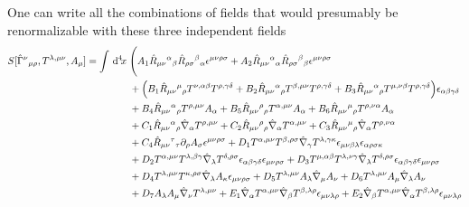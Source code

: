 \documentclass[%
  showpacs,showkeys,prd,superscriptaddress]{revtex4-1}
\begin{document}
One can  write all the combinations of fields that would presumably be renormalizable with these three independent fields
\begin{equation}
  \begin{split}
    \label{3+1full}
     S[\hat{\Gamma}^{\nu}{}_{\mu\rho},T^{\lambda,\mu\nu},A_{\mu}] =\int \dn{4}{x} & \Bigg( A_1 \hat{ R}_{\mu\nu}{}^{\alpha}{}_\beta \hat{ R}_{\rho\sigma}{}^{\beta}{}_\alpha\epsilon^{\mu\nu\rho\sigma}+A_2 \hat{ R}_{\mu\nu}{}^{\alpha}{}_\alpha \hat{ R}_{\rho\sigma}{}^{\beta}{}_\beta\epsilon^{\mu\nu\rho\sigma}
    \\
    & + \Big(B_1 \hat{ R}_{\mu\nu}{}^{\mu}{}_\rho T^{\nu,\alpha\beta}T^{\rho,\gamma\delta}+B_2 \hat{ R}_{\mu\nu}{}^{\alpha}{}_\rho T^{\beta,\mu\nu}T^{\rho,\gamma\delta}+B_3\hat{ R}_{\mu\nu}{}^{\alpha}{}_\rho T^{\mu,\nu\beta}T^{\rho,\gamma\delta}\Big)\epsilon_{\alpha\beta\gamma\delta}
    \\
    & + B_4\hat{ R}_{\mu\nu}{}^{\alpha}{}_\rho T^{\rho,\mu\nu}A_\alpha+B_5\hat{ R}_{\mu\nu}{}^{\rho}{}_\rho T^{\alpha,\mu\nu}A_\alpha+B_6 \hat{ R}_{\mu\nu}{}^{\mu}{}_\rho T^{\rho,\nu\alpha}A_\alpha 
    \\
    & + C_1\hat{ R}_{\mu\nu}{}^{\alpha}{}_\rho \hat{\nabla}_\alpha T^{\rho,\mu\nu}+C_2\hat{ R}_{\mu\nu}{}^{\rho}{}_\rho \hat{\nabla}_\alpha T^{\alpha,\mu\nu} +C_3 \hat{ R}_{\mu\nu}{}^{\mu}{}_\rho \hat{\nabla}_\alpha T^{\rho,\nu\alpha}
    \\
    & +C_4\hat{ R}_{\mu\nu}{}^{\tau}{}_\tau \partial_\rho A_\sigma \epsilon^{\mu\nu\rho\sigma}+D_1T^{\alpha,\mu\nu}T^{\beta,\rho\sigma}\hat{\nabla}_\gamma T^{\lambda,\gamma\kappa}\epsilon_{\mu\nu\beta\lambda}\epsilon_{\alpha\rho\sigma\kappa}
    \\  
    & + D_2T^{\alpha,\mu\nu}T^{\lambda,\beta\gamma}\hat{\nabla}_\lambda T^{\delta,\rho\sigma}\epsilon_{\alpha\beta\gamma\delta}\epsilon_{\mu\nu\rho\sigma}+D_3T^{\mu,\alpha\beta}T^{\lambda,\nu\gamma}\hat{\nabla}_\lambda T^{\delta,\rho\sigma}\epsilon_{\alpha\beta\gamma\delta}\epsilon_{\mu\nu\rho\sigma}
    \\
    & + D_4T^{\lambda,\mu\nu}T^{\kappa,\rho\sigma}\hat{\nabla}_\lambda A_\kappa \epsilon_{\mu\nu\rho\sigma}+D_5T^{\lambda,\mu\nu}A_\lambda\hat{\nabla}_\mu A_\nu +D_6T^{\lambda,\mu\nu}A_\mu\hat{\nabla}_\lambda A_\nu
    \\
    & + D_7A_\lambda  A_\mu\hat{\nabla}_\nu T^{\lambda,\mu\nu} +E_1\hat{\nabla}_\alpha T^{\alpha,\mu\nu}\hat{\nabla}_\beta T^{\beta,\lambda\rho}\epsilon_{\mu\nu\lambda\rho}+E_2\hat{\nabla}_\beta T^{\alpha,\mu\nu}\hat{\nabla}_\alpha T^{\beta,\lambda\rho}\epsilon_{\mu\nu\lambda\rho}

\end{split}
\end{equation}
\end{document}

